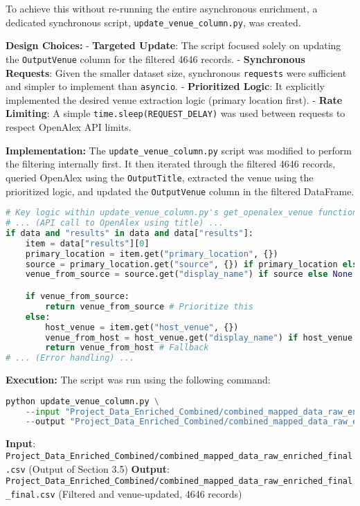 \documentclass[12pt]{article}
\begin{document}
To achieve this without re-running the entire asynchronous enrichment, a
dedicated synchronous script, \texttt{update\_venue\_column.py}, was
created.

\textbf{Design Choices:} - \textbf{Targeted Update}: The script focused
solely on updating the \texttt{OutputVenue} column for the filtered 4646
records. - \textbf{Synchronous Requests}: Given the smaller dataset
size, synchronous \texttt{requests} were sufficient and simpler to
implement than \texttt{asyncio}. - \textbf{Prioritized Logic}: It
explicitly implemented the desired venue extraction logic (primary
location first). - \textbf{Rate Limiting}: A simple
\texttt{time.sleep(REQUEST\_DELAY)} was used between requests to respect
OpenAlex API limits.

\textbf{Implementation:} The \texttt{update\_venue\_column.py} script
was modified to perform the filtering internally first. It then iterated
through the filtered 4646 records, queried OpenAlex using the
\texttt{OutputTitle}, extracted the venue using the prioritized logic,
and updated the \texttt{OutputVenue} column in the filtered DataFrame.

\begin{lstlisting}[language=Python]
# Key logic within update_venue_column.py's get_openalex_venue function
# ... (API call to OpenAlex using title) ...
if data and "results" in data and data["results"]:
    item = data["results"][0]
    primary_location = item.get("primary_location", {})
    source = primary_location.get("source", {}) if primary_location else {}
    venue_from_source = source.get("display_name") if source else None

    if venue_from_source:
        return venue_from_source # Prioritize this
    else:
        host_venue = item.get("host_venue", {})
        venue_from_host = host_venue.get("display_name") if host_venue else None
        return venue_from_host # Fallback
# ... (Error handling) ...
\end{lstlisting}

\textbf{Execution:} The script was run using the following command:

\begin{lstlisting}[language=Python]
python update_venue_column.py \
    --input "Project_Data_Enriched_Combined/combined_mapped_data_raw_enriched_final.csv" \
    --output "Project_Data_Enriched_Combined/combined_mapped_data_raw_enriched_final_final.csv"
\end{lstlisting}

\textbf{Input}:
\texttt{Project\_Data\_Enriched\_Combined/combined\_mapped\_data\_raw\_enriched\_final.csv}
(Output of Section 3.5) \textbf{Output}:
\texttt{Project\_Data\_Enriched\_Combined/combined\_mapped\_data\_raw\_enriched\_final\_final.csv}
(Filtered and venue-updated, 4646 records)
\end{document}
